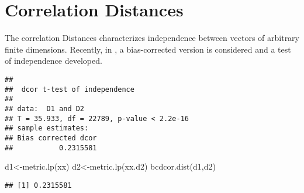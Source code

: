 \documentclass[
]{book}
\newenvironment{Shaded}{\begin{snugshade}}{\end{snugshade}}
\newcommand{\AttributeTok}[1]{\textcolor[rgb]{0.77,0.63,0.00}{#1}}
\newcommand{\ConstantTok}[1]{\textcolor[rgb]{0.00,0.00,0.00}{#1}}
\newcommand{\DecValTok}[1]{\textcolor[rgb]{0.00,0.00,0.81}{#1}}
\newcommand{\FunctionTok}[1]{\textcolor[rgb]{0.00,0.00,0.00}{#1}}
\newcommand{\NormalTok}[1]{#1}
\newcommand{\OtherTok}[1]{\textcolor[rgb]{0.56,0.35,0.01}{#1}}
\newcommand{\SpecialCharTok}[1]{\textcolor[rgb]{0.00,0.00,0.00}{#1}}
\newcommand{\StringTok}[1]{\textcolor[rgb]{0.31,0.60,0.02}{#1}}
\begin{document}
\hypertarget{correlation-distances}{%
\section{Correlation Distances}\label{correlation-distances}}

The correlation Distances characterizes independence between vectors of arbitrary finite dimensions. Recently, in \citep{Szekely2013}, a bias-corrected version is considered and a test of independence developed.

\begin{Shaded}
\end{Shaded}

\begin{verbatim}
## 
##  dcor t-test of independence
## 
## data:  D1 and D2
## T = 35.933, df = 22789, p-value < 2.2e-16
## sample estimates:
## Bias corrected dcor 
##           0.2315581
\end{verbatim}

\begin{Shaded}
\begin{Highlighting}[]
\NormalTok{d1}\OtherTok{\textless{}{-}}\FunctionTok{metric.lp}\NormalTok{(xx)}
\NormalTok{d2}\OtherTok{\textless{}{-}}\FunctionTok{metric.lp}\NormalTok{(xx.d2)}
\FunctionTok{bcdcor.dist}\NormalTok{(d1,d2)}
\end{Highlighting}
\end{Shaded}

\begin{verbatim}
## [1] 0.2315581
\end{verbatim}

\begin{Shaded}
\end{Shaded}
\end{document}
